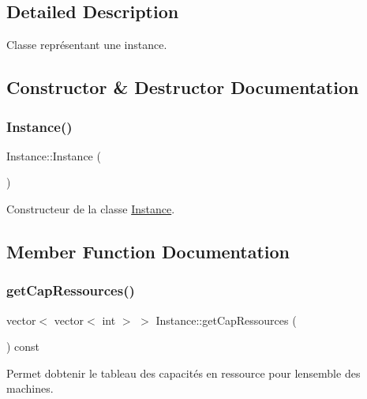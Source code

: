 \subsection{Detailed Description}
Classe représentant une instance. 

\subsection{Constructor \& Destructor Documentation}
\mbox{\label{classInstance_a399506c7e75ab9ab78fbc34a25932bbd}} 
\subsubsection{\texorpdfstring{Instance()}{Instance()}}
{\footnotesize\ttfamily Instance\+::\+Instance (\begin{DoxyParamCaption}{ }\end{DoxyParamCaption})}



Constructeur de la classe \hyperlink{classInstance}{Instance}. 



\subsection{Member Function Documentation}
\mbox{\label{classInstance_a98fcba260003717a635cec8fee3c3a27}} 
\subsubsection{\texorpdfstring{get\+Cap\+Ressources()}{getCapRessources()}}
{\footnotesize\ttfamily vector$<$ vector$<$ int $>$ $>$ Instance\+::get\+Cap\+Ressources (\begin{DoxyParamCaption}{ }\end{DoxyParamCaption}) const}



Permet d\textquotesingle{}obtenir le tableau des capacités en ressource pour l\textquotesingle{}ensemble des machines. 


